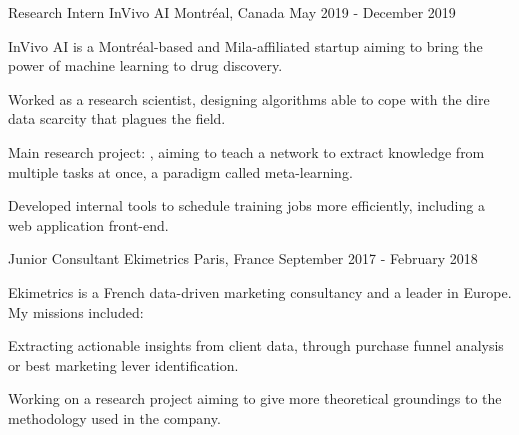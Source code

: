 

\begin{cventries}

    \cventry
    {Research Intern} %
    {InVivo AI} %
    {Montréal, Canada} %
    {May 2019 - December 2019} %
    {
        InVivo AI is a Montréal-based and Mila-affiliated startup aiming to bring the power of machine learning to drug discovery.
        \vspace{4.5mm}
        \begin{cvitems} %
          \item Worked as a research scientist, designing algorithms able to cope with the dire data scarcity that plagues the field.
          \item Main research project: , aiming to teach a network to extract knowledge from multiple tasks at once, a paradigm called meta-learning.
          \item Developed internal tools to schedule training jobs more efficiently, including a web application front-end.
        \end{cvitems}
    }

    \cventry
    {Junior Consultant} %
    {Ekimetrics} %
    {Paris, France} %
    {September 2017 - February 2018} %
    {
        Ekimetrics is a French data-driven marketing consultancy and a leader in Europe. My missions included:
        \vspace{4.5mm}
        \begin{cvitems} %
            \item Extracting actionable insights from client data, through purchase funnel analysis or best marketing lever identification.
            \item Working on a research project aiming to give more theoretical groundings to the methodology used in the company.
        \end{cvitems}
    }


\end{cventries}
